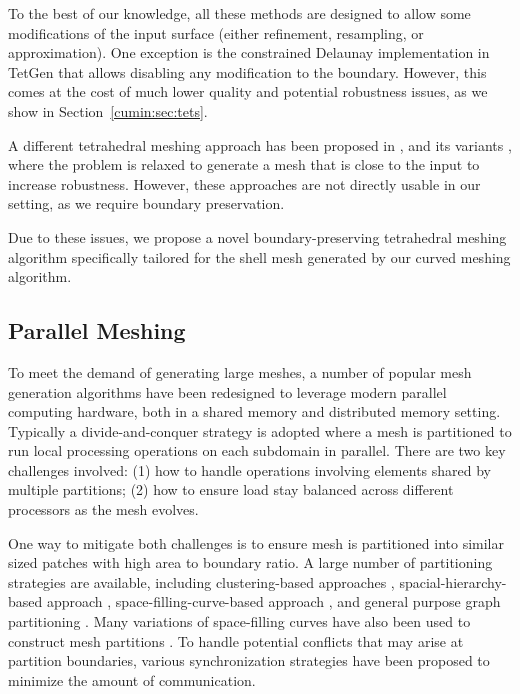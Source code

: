 To the best of our knowledge, all these methods are designed to allow some modifications of the input surface (either refinement, resampling, or approximation). One exception is the constrained Delaunay implementation in TetGen \cite{tetgen} that allows disabling any modification to the boundary. However, this comes at the cost of much lower quality and potential robustness issues, as we show in Section~\ref{cumin:sec:tets}.

A different tetrahedral meshing approach has been proposed in \cite{hu2018tetrahedral}, and its variants \cite{hu2019triwild,Hu:2020:fTetWild}, where the problem is relaxed to generate a mesh that is close to the input to increase robustness. However, these approaches are not directly usable in our setting, as we require boundary preservation.

Due to these issues, we propose a novel boundary-preserving tetrahedral meshing algorithm specifically tailored for the shell mesh generated by our curved meshing algorithm.



\subsection{Parallel Meshing}

To meet the demand of generating large meshes,
a number of popular mesh generation algorithms have been redesigned to
leverage modern parallel computing hardware, both in a shared memory and distributed memory setting. Typically a divide-and-conquer strategy is adopted where a mesh is partitioned to run local processing operations
on each subdomain in parallel.  There are two key challenges involved: (1) how to
handle operations involving elements shared by multiple partitions; (2) how to
ensure load stay balanced across different processors as the mesh evolves.

One way to mitigate both challenges is to ensure mesh is partitioned into
similar sized patches with high area to boundary ratio.
A large number of partitioning strategies are available, including
clustering-based approaches \cite{Mahmoud2021}, spacial-hierarchy-based approach
\cite{loseille2017unique,lo2012parallel}, space-filling-curve-based approach
\cite{marot2019one,borrell2018parallel}, and general purpose graph partitioning \cite{karypis1998fast}. Many variations of space-filling curves have also been used to construct mesh partitions \cite{chrisochoides2006parallel, aluru1997parallel}.
%
To handle potential conflicts that may arise at partition boundaries,
various synchronization strategies have been proposed
\cite{okusanya1996parallel,chrisochoides2003parallel,chrisochoides2006parallel} to minimize the amount of
communication.
%

